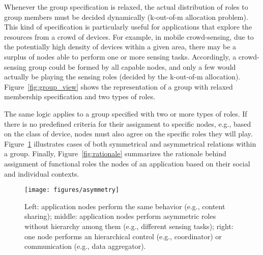 Whenever the group specification is relaxed, the actual distribution of roles to group members must be decided dynamically (k-out-of-m allocation problem). This kind of specification is particularly useful for applications that explore the resources from a crowd of devices. For example, in mobile crowd-sensing, due to the potentially high density of devices within a given area, there may be a surplus of nodes able to perform one or more sensing tasks. Accordingly, a crowd-sensing group could be formed by all capable nodes, and only a few would actually be playing the sensing roles (decided by the k-out-of-m allocation). Figure~\ref{fig:group_view} shows the representation of a group with relaxed membership specification and two types of roles.


 


The same logic applies to a group specified with two or more types of roles. If there is no predefined criteria for their assignment to specific nodes, e.g., based on the class of device, nodes must also agree on the specific roles they will play. Figure~\ref{fig:asymmetry} illustrates cases of both symmetrical and asymmetrical relations within a group. Finally, Figure~\ref{fig:rationale} summarizes the rationale behind assignment of functional roles the nodes of an application based on their social and individual contexts.

\begin{figure}[t!]
	\centering
	\texttt{[image: figures/asymmetry]}
	\caption{Left: application nodes perform the same behavior (e.g., content sharing); middle: application nodes perform asymmetric roles without hierarchy among them (e.g., different sensing tasks); right: one node performs an hierarchical control (e.g., coordinator) or communication (e.g., data aggregator).}
	\label{fig:asymmetry}
\end{figure}


